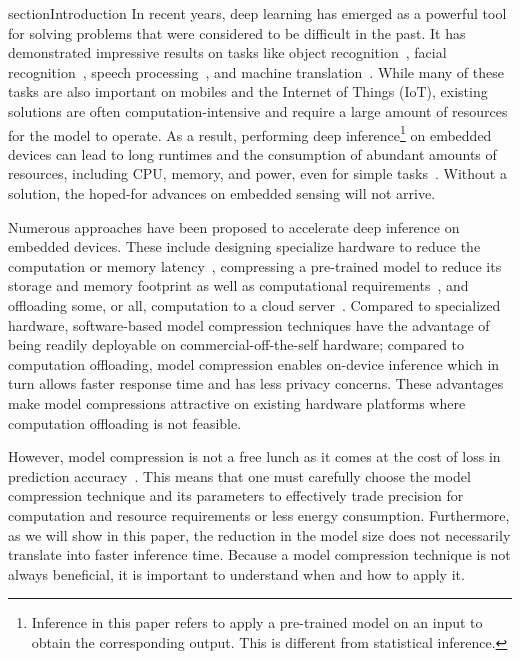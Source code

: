 section{Introduction}
In recent years, deep learning has emerged as a powerful tool for solving problems that were considered to be difficult in the past. It has
demonstrated impressive results on tasks like object recognition~\cite{donahue14,he2016deep}, facial
recognition~\cite{parkhi2015deep,sun2014deep}, speech processing~\cite{pmlrv48amodei16}, and machine translation~\cite{bahdanau2014neural}.
While many of these tasks are also important on mobiles and the Internet of Things (IoT), existing solutions are often
computation-intensive and require a large amount of resources for the model to operate. As a result, performing deep
inference\footnote{Inference in this paper refers to apply a pre-trained model on an input to obtain the corresponding output. This is
different from statistical inference.} on embedded devices can lead to long runtimes and the consumption of abundant amounts of resources,
including CPU, memory, and power, even for simple tasks~\cite{CanzianiPC16}. Without a solution,
 the hoped-for advances on embedded sensing will not arrive.


Numerous approaches have been proposed to accelerate deep inference on embedded devices. These include designing specialize hardware to
reduce the computation or memory latency~\cite{}, compressing a pre-trained model to reduce its storage and memory footprint as well as
computational requirements~\cite{}, and offloading some, or all, computation to a cloud
server~\cite{Kang2017neurosurgeon,teerapittayanon2017distributed}. Compared to specialized hardware, software-based model compression
techniques have the advantage of being readily deployable on commercial-off-the-self hardware; compared to computation offloading, model
compression enables on-device inference which in turn allows faster response time and has less privacy concerns. These advantages make
model compressions attractive on existing hardware platforms where computation offloading is not feasible.


However, model compression is not a free lunch as it comes at the cost of loss in prediction accuracy~\cite{}. This means that one must
carefully choose the model compression technique and its parameters to effectively trade precision for computation and resource
requirements or less energy consumption. Furthermore, as we will show in this paper, the reduction in the model size does not necessarily
translate into faster inference time. Because a model compression technique is not always beneficial, it is important to understand when
and how to apply it.

